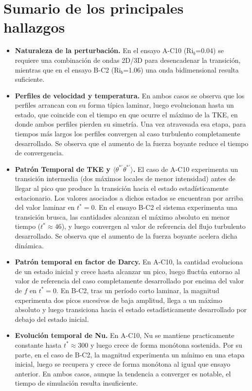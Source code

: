 \section{Sumario de los principales hallazgos}
\begin{itemize}

\item \textbf{Naturaleza de la perturbación.} En el ensayo A-C10 (Ri$_b$=0.04) se requiere una combinación de ondas 2D/3D para desencadenar la transición, mientras que en el ensayo B-C2 (Ri$_b$=1.06) una onda bidimensional resulta suficiente.

\item \textbf{Perfiles de velocidad y temperatura.} En ambos casos se observa que los perfiles arrancan con su forma típica laminar, luego evolucionan hasta un estado, que coincide con el tiempo en que ocurre el máximo de la TKE, en donde ambos perfiles pierden su simetría. Una vez atravesada esa etapa, para tiempos más largos los perfiles convergen al caso turbulento completamente desarrollado.  Se observa que el aumento de la fuerza boyante reduce el tiempo de convergencia. 

\item \textbf{Patrón Temporal de TKE y $\langle\theta^{*\prime}\theta^{*\prime}\rangle$.} El caso de A-C10 experimenta un transición intermedia (dos máximos locales de menor intensidad) antes de llegar al pico que produce la transición hacia el estado estadísticamente estacionario. Los valores asociados a dichos estados se encuentran por arriba del valor laminar en $t^*=0$. En el ensayo B-C2 el sistema experimenta una transición brusca, las cantidades alcanzan el máximo absoluto en menor tiempo ($t^*\approx 46$), y luego convergen al valor de referencia del flujo turbulento desarrollado. Se observa que el aumento de la fuerza boyante acelera dicha dinámica. 

\item \textbf{Patrón temporal en factor de Darcy.} En A-C10, la cantidad evoluciona de un estado inicial y crece hasta alcanzar un pico, luego fluctúa entorno al valor de referencia del caso completamente desarrollado por encima del valor de $f$ en $t^*=0$. En B-C2, tras un período corto laminar, la magnitud experimenta dos picos sucesivos de baja amplitud, llega a un máximo absoluto y luego transiciona hacia el estado estadísticamente desarrollado por debajo del estado inicial.   

\item \textbf{Evolución temporal de Nu.} En A-C10, Nu se mantiene practicamente constante hasta $t^* \approx 300$ y luego crece de forma monótona sostenida. Por su parte, en el caso de B-C2, la magnitud experimenta un mínimo en una etapa inicial, luego se recupera y crece de forma monótona al igual que ensayo anterior. En ambos casos, aunque la tendencia a converger es notable, el tiempo de simulación resulta insuficiente. 

\end{itemize}